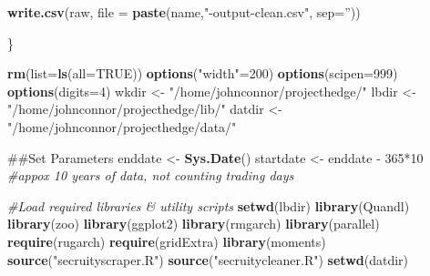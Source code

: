 \documentclass[]{elsarticle} %
\newenvironment{Shaded}{\begin{snugshade}}{\end{snugshade}}
\newcommand{\KeywordTok}[1]{\textcolor[rgb]{0.13,0.29,0.53}{\textbf{{#1}}}}
\newcommand{\DataTypeTok}[1]{\textcolor[rgb]{0.13,0.29,0.53}{{#1}}}
\newcommand{\DecValTok}[1]{\textcolor[rgb]{0.00,0.00,0.81}{{#1}}}
\newcommand{\StringTok}[1]{\textcolor[rgb]{0.31,0.60,0.02}{{#1}}}
\newcommand{\CommentTok}[1]{\textcolor[rgb]{0.56,0.35,0.01}{\textit{{#1}}}}
\newcommand{\OtherTok}[1]{\textcolor[rgb]{0.56,0.35,0.01}{{#1}}}
\newcommand{\NormalTok}[1]{{#1}}
\begin{document}
\begin{Shaded}
\begin{Highlighting}[]
\KeywordTok{write.csv}\NormalTok{(raw, }\DataTypeTok{file =} \KeywordTok{paste}\NormalTok{(name,}\StringTok{"-output-clean.csv"}\NormalTok{, }\DataTypeTok{sep=}\StringTok{''}\NormalTok{))}

\NormalTok{\}}
\end{Highlighting}
\end{Shaded}

\begin{Shaded}
\begin{Highlighting}[]
\KeywordTok{rm}\NormalTok{(}\DataTypeTok{list=}\KeywordTok{ls}\NormalTok{(}\DataTypeTok{all=}\OtherTok{TRUE}\NormalTok{))}
\KeywordTok{options}\NormalTok{(}\StringTok{"width"}\NormalTok{=}\DecValTok{200}\NormalTok{)}
\KeywordTok{options}\NormalTok{(}\DataTypeTok{scipen=}\DecValTok{999}\NormalTok{)}
\KeywordTok{options}\NormalTok{(}\DataTypeTok{digits=}\DecValTok{4}\NormalTok{)}
\NormalTok{wkdir <-}\StringTok{ "/home/johnconnor/projecthedge/"}
\NormalTok{lbdir <-}\StringTok{ "/home/johnconnor/projecthedge/lib/"}
\NormalTok{datdir <-}\StringTok{ "/home/johnconnor/projecthedge/data/"}

\NormalTok{##Set Parameters}
\NormalTok{enddate <-}\StringTok{ }\KeywordTok{Sys.Date}\NormalTok{()}
\NormalTok{startdate <-}\StringTok{ }\NormalTok{enddate -}\StringTok{ }\DecValTok{365}\NormalTok{*}\DecValTok{10} \CommentTok{#appox 10 years of data, not counting trading days}

\CommentTok{#Load required libraries & utility scripts}
\KeywordTok{setwd}\NormalTok{(lbdir)}
\KeywordTok{library}\NormalTok{(Quandl)}
\KeywordTok{library}\NormalTok{(zoo)}
\KeywordTok{library}\NormalTok{(ggplot2)}
\KeywordTok{library}\NormalTok{(rmgarch)}
\KeywordTok{library}\NormalTok{(parallel)}
\KeywordTok{require}\NormalTok{(rugarch)            }
\KeywordTok{require}\NormalTok{(gridExtra)}
\KeywordTok{library}\NormalTok{(moments)}
\KeywordTok{source}\NormalTok{(}\StringTok{"secruityscraper.R"}\NormalTok{)}
\KeywordTok{source}\NormalTok{(}\StringTok{"secruitycleaner.R"}\NormalTok{)}
\KeywordTok{setwd}\NormalTok{(datdir)}


\end{Highlighting}
\end{Shaded}
\end{document}
